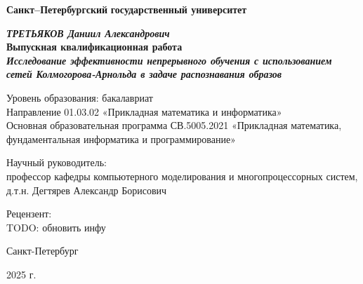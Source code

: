 \documentclass[a4paper,article,14pt]{extarticle}
\begin{document}
\begin{titlepage}
\begin{center}

\textbf{Санкт--Петербургский}
\textbf{государственный университет}

\vspace{35mm}

\textbf{\textit{\large ТРЕТЬЯКОВ Даниил Александрович}} \\[8mm]
\textbf{\large Выпускная квалификационная работа}\\[3mm]
\textbf{\textit{\large Исследование эффективности непрерывного обучения с 
использованием сетей Колмогорова-Арнольда в задаче распознавания образов}}

\vspace{20mm}
Уровень образования: бакалавриат\\
Направление 01.03.02 «Прикладная математика и информатика»\\
Основная образовательная программа СВ.5005.2021
«Прикладная математика, фундаментальная информатика и программирование»\\[25mm]


\begin{flushright}
\begin{minipage}[t]{0.65\textwidth}
{Научный руководитель:} \\
профессор кафедры компьютерного моделирования и многопроцессорных систем, д.т.н. 
Дегтярев Александр Борисович

\vspace{10mm}

{Рецензент:} \\
TODO: обновить инфу
\end{minipage}
\end{flushright}

\vfill 

{Санкт-Петербург}
\par{2025 г.}
\end{center}
\end{titlepage}
\restoregeometry
\addtocounter{page}{1}

\tableofcontents
\pagebreak
\end{document}

